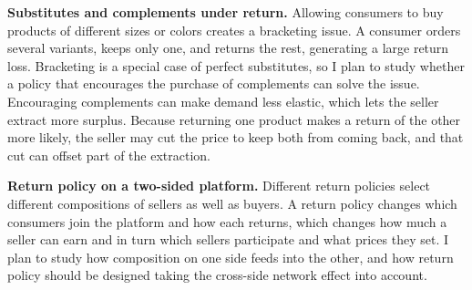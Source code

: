 \documentclass[11pt]{article}
\begin{document}
\textbf{Substitutes and complements under return.} Allowing consumers to buy products of different sizes or colors creates a bracketing issue. A consumer orders several variants, keeps only one, and returns the rest, generating a large return loss. Bracketing is a special case of perfect substitutes, so I plan to study whether a policy that encourages the purchase of complements can solve the issue. Encouraging complements can make demand less elastic, which lets the seller extract more surplus. Because returning one product makes a return of the other more likely, the seller may cut the price to keep both from coming back, and that cut can offset part of the extraction.

\textbf{Return policy on a two-sided platform.} Different return policies select different compositions of sellers as well as buyers. A return policy changes which consumers join the platform and how each returns, which changes how much a seller can earn and in turn which sellers participate and what prices they set. I plan to study how composition on one side feeds into the other, and how return policy should be designed taking the cross-side network effect into account.
\end{document}

